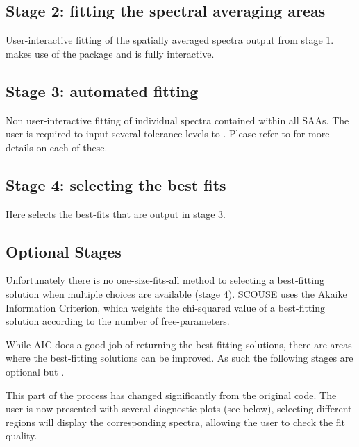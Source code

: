 \documentclass[letterpaper,10pt,english]{sphinxmanual}
\begin{document}
\subsection{Stage 2: fitting the spectral averaging areas}
\label{\detokenize{description:stage-2-fitting-the-spectral-averaging-areas}}
User-interactive fitting of the spatially averaged spectra output from stage 1.
 makes use of the 
package and is fully interactive.


\subsection{Stage 3: automated fitting}
\label{\detokenize{description:stage-3-automated-fitting}}
Non user-interactive fitting of individual spectra contained within all SAAs.
The user is required to input several tolerance levels to . Please
refer to 
for more details on each of these.


\subsection{Stage 4: selecting the best fits}
\label{\detokenize{description:stage-4-selecting-the-best-fits}}
Here  selects the best-fits that are output in stage 3.


\subsection{Optional Stages}
\label{\detokenize{description:optional-stages}}
Unfortunately there is no one-size-fits-all method to selecting a best-fitting
solution when multiple choices are available (stage 4). SCOUSE uses the Akaike
Information Criterion, which weights the chi-squared value of a best-fitting
solution according to the number of free-parameters.

While AIC does a good job of returning the best-fitting solutions, there are
areas where the best-fitting solutions can be improved. As such the following
stages are optional but .

This part of the process has changed significantly from the original code. The
user is now presented with several diagnostic plots (see below), selecting
different regions will display the corresponding spectra, allowing the user to
check the fit quality.
\end{document}
